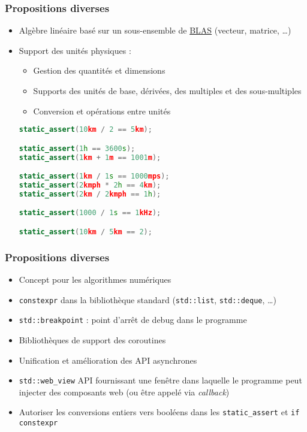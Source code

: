\documentclass[C++.tex]{subfiles}
\begin{document}
\begin{frame}[fragile]
	\frametitle{Propositions diverses}
	\begin{itemize}
		\item Algèbre linéaire basé sur un sous-ensemble de \href{https://www.netlib.org/blas/}{BLAS} (vecteur, matrice, \ldots)
		\item Support des unités physiques :
		\begin{itemize}
			\item Gestion des quantités et dimensions
			\item Supports des unités de base, dérivées, des multiples et des sous-multiples
			\item Conversion et opérations entre unités
		\end{itemize}

		\begin{lstlisting}[language=C++]
static_assert(10km / 2 == 5km);

static_assert(1h == 3600s);
static_assert(1km + 1m == 1001m);

static_assert(1km / 1s == 1000mps);
static_assert(2kmph * 2h == 4km);
static_assert(2km / 2kmph == 1h);

static_assert(1000 / 1s == 1kHz);

static_assert(10km / 5km == 2);\end{lstlisting}
	\end{itemize}
\end{frame}

\begin{frame}[fragile]
	\frametitle{Propositions diverses}
	\begin{itemize}
		\item Concept pour les algorithmes numériques
		\item \lstinline|constexpr| dans la bibliothèque standard (\lstinline|std::list|, \lstinline|std::deque|, \ldots)


		\item \lstinline|std::breakpoint| : point d'arrêt de debug dans le programme
		\item Bibliothèques de support des coroutines
		\item Unification et amélioration des API asynchrones


		\item \lstinline|std::web_view| API fournissant une fenêtre dans laquelle le programme peut injecter des composants web (ou être appelé via \textit{callback})
		\item Autoriser les conversions entiers vers booléens dans les \lstinline|static_assert| et \lstinline|if constexpr|
	\end{itemize}
\end{frame}
\end{document}
